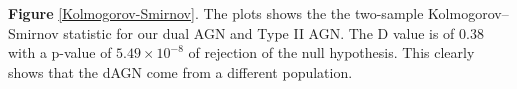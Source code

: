 \label{Kolmogorov-Smirnov} \textbf{Figure} \ref{Kolmogorov-Smirnov}. The plots shows the the two-sample Kolmogorov–Smirnov statistic for our dual AGN and Type II AGN. The D value is of 0.38 with a p-value of $5.49\times10^{-8}$ of rejection of the null hypothesis. This clearly shows that the dAGN come from a different population.
  